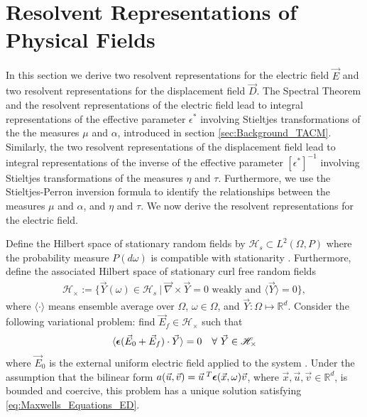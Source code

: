 \documentclass[english,12pt]{ttuthes}
\newcommand\beps{\mbox{\boldmath${\epsilon}$}}
\begin{document}
\section{Resolvent Representations of Physical Fields}
\label{sec:Resolv_Rep_E_D}
%
In this section we derive two resolvent representations for the
electric field $\vec{E}$ and two resolvent representations for the
displacement field $\vec{D}$. The Spectral Theorem \cite{Reed-1980} and the
resolvent representations of the electric field lead to integral
representations of the effective parameter $\epsilon^*$ involving Stieltjes
transformations of the the measures $\mu$ and $\alpha$, introduced in section 
\ref{sec:Background_TACM}. Similarly, the two resolvent
representations of the displacement field lead to integral
representations of the inverse of the effective parameter $[\epsilon^*]^{-1}$
involving Stieltjes transformations of the measures $\eta$ and
$\tau$. Furthermore, we use the Stieltjes-Perron inversion formula
\cite{Henrici:1974:v2,Henrici:1974:v3} to identify the relationships
between the measures $\mu$ and $\alpha$, and $\eta$ and $\tau$. We now derive the
resolvent representations for the electric field.

Define the Hilbert space of stationary random fields by $\mathscr{H}_s\subset L^2(\Omega,P)$
where the probability measure $P(d\omega)$ is compatible with
stationarity \cite{Golden:CMP-473}. Furthermore, define the associated
Hilbert space of stationary curl free random fields  
%
\begin{align}\label{eq:curlfreeHilbert}
  \mathscr{H}_\times:=\{\vec{Y}(\omega)\in \mathscr{H}_s \ | \ \vec{\nabla} \times\vec{Y}=0 \text{ weakly and }
\langle\vec{Y}\rangle=0\}, 
\end{align}
%
where $\langle\cdot\rangle$ means ensemble average over $\Omega$, $\omega\in\Omega$, and
$\vec{Y}:\Omega\mapsto\mathbb{R}^d$. Consider the following variational problem: 
find $\vec{E}_f\in\mathscr{H}_\times$ such that   
%
\begin{align}\label{eq:Weak_Curl_Free_Variational_Form}
  \langle\beps(\vec{E}_0+\vec{E}_f)\cdot\vec{Y}\rangle=0 \quad  \forall \
  \vec{Y}\in\mathscr{H}_\times
\end{align}
%
where $\vec{E}_0$ is the external uniform electric field applied to
the system \cite{Golden:CMP-473}. Under the assumption that the
bilinear form
$a(\vec{u},\vec{v})=\vec{u}^{\;T}\beps(\vec{x},\omega)\vec{v}$, where
$\vec{x},\vec{u},\vec{v}\in\mathbb{R}^d$, is bounded and coercive, this
problem has a unique solution \cite{Golden:CMP-473} satisfying
\eqref{eq:Maxwells_Equations_ED}.    
\end{document}
